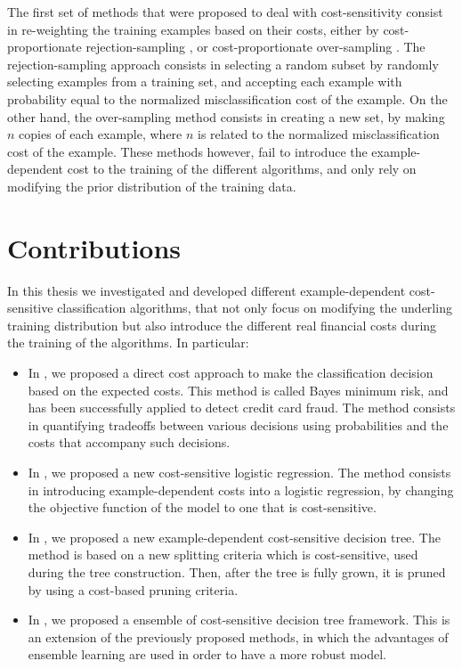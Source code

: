   The first set of methods that were proposed to deal with cost-sensitivity consist in 
  re-weighting the training examples based on their costs, either by cost-proportionate 
  rejection-sampling \citep{Zadrozny2003}, or cost-proportionate over-sampling \citep{Elkan2001}.
  The rejection-sampling approach consists in selecting a random subset by randomly 
  selecting examples from a training set, and accepting each example with probability equal to 
  the normalized misclassification cost of the example. On the other hand, the over-sampling 
  method consists in creating a new set, by making $n$ copies of each example, where $n$ is related 
  to the normalized misclassification cost of the example.
  These methods however, fail to introduce the example-dependent cost to the training of the 
  different algorithms, and only rely on modifying the prior distribution of the training data.

  
\section{Contributions}

  In this thesis we investigated and developed different example-dependent 
  cost-sensitive classification algorithms, that not only focus on modifying the underling training 
  distribution but also introduce the different real financial costs during the training of the 
  algorithms. In particular:
  
\begin{itemize}

\item In \citep{CorreaBahnsen2013,CorreaBahnsen2014}, we proposed a direct 
  cost approach to make the classification decision based on the expected costs. This method is 
  called Bayes minimum risk, and has been successfully applied to detect credit card fraud. The 
  method consists in quantifying tradeoffs between various decisions using probabilities and the 
  costs that accompany such decisions. 

\item In \citep{CorreaBahnsen2014b}, we proposed a new cost-sensitive logistic regression. 
  The   method consists in introducing example-dependent costs into a logistic regression, by 
  changing   the objective function of the model to one that is  cost-sensitive.
 
\item In \citep{CorreaBahnsen2015}, we proposed a new example-dependent cost-sensitive decision 
  tree. The method is based on a new splitting criteria which is cost-sensitive, used during the 
  tree construction. Then, after the tree is fully grown, it is pruned by using a cost-based 
  pruning criteria. 
  
\item In \citep{CorreaBahnsen2015b}, we proposed a ensemble of cost-sensitive decision tree 
framework. This is an extension of the previously proposed methods, in which the 
  advantages of ensemble learning are used in order to have a more robust model.

\end{itemize}

